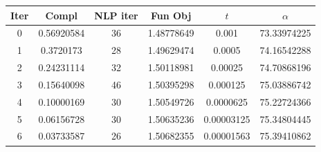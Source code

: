 \begin{tabular}{c c c c c c}
\toprule
Iter & Compl & NLP iter & Fun Obj & $t$ & $\alpha$ \\
\midrule
0 & 0.56920584 & 36 & 1.48778649 & 0.001 & 73.33974225 \\
1 & 0.3720173 & 28 & 1.49629474 & 0.0005 & 74.16542288 \\
2 & 0.24231114 & 32 & 1.50118981 & 0.00025 & 74.70868196 \\
3 & 0.15640098 & 46 & 1.50395298 & 0.000125 & 75.03886742 \\
4 & 0.10000169 & 30 & 1.50549726 & 0.0000625 & 75.22724366 \\
5 & 0.06156728 & 30 & 1.50635236 & 0.00003125 & 75.34804445 \\
6 & 0.03733587 & 26 & 1.50682355 & 0.00001563 & 75.39410862 \\
\bottomrule
\end{tabular}